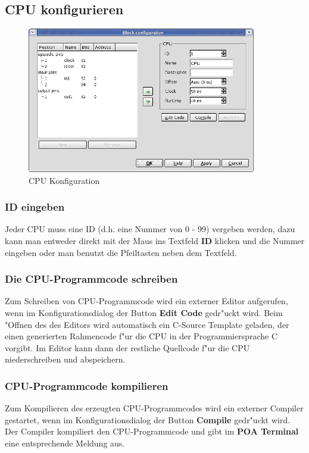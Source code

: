 \documentclass[a4paper,titlepage,12pt,ngerman]{scrbook}
\begin{document}
\subsection{CPU konfigurieren}
\begin{figure}[htbp]

\begin{center}

\includegraphics[width=10cm]{CPUConfiguration}

\caption{CPU Konfiguration}\label{test}

\end{center}

\end{figure}
\subsubsection{ID eingeben}
Jeder CPU muss eine ID (d.h. eine Nummer von 0 - 99) vergeben werden, dazu kann man entweder direkt mit der Maus ins Textfeld {\bf ID} klicken und die Nummer eingeben oder man benutzt die Pfeiltasten neben dem Textfeld.

\subsubsection{Die CPU-Programmcode schreiben}
Zum Schreiben von CPU-Programmcode wird ein externer Editor aufgerufen, wenn im Konfigurationsdialog der Button {\bf Edit Code} gedr"uckt wird. Beim "Offnen des des Editors wird automatisch ein C-Source Template geladen, der einen generierten Rahmencode f"ur die CPU in der Programmiersprache C vorgibt. Im Editor kann dann der restliche Quellcode f"ur die CPU niederschreiben und abspeichern.

\subsubsection{CPU-Programmcode kompilieren}
Zum Kompilieren des erzeugten CPU-Programmcodes wird ein externer Compiler gestartet, wenn im Konfigurationsdialog der Button {\bf Compile} gedr"uckt wird. Der Compiler kompiliert den CPU-Programmcode und gibt im {\bf POA Terminal} eine entsprechende Meldung aus.
\end{document}
